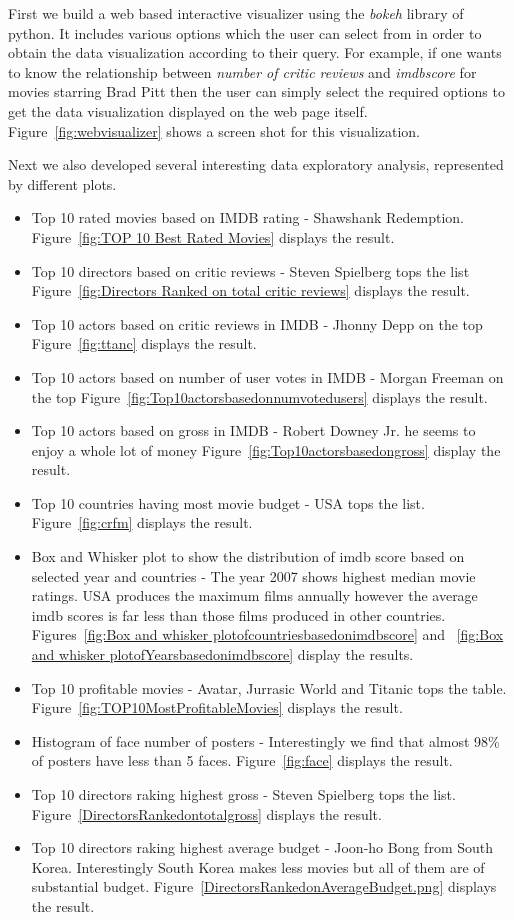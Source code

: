 \documentclass{article}%
\begin{document}
First we build a web based interactive visualizer using the \textit{bokeh} library of python. It includes various options which the user can select from in order to obtain the data visualization according to their query. For example, if one wants to know the relationship between \textit{number of critic reviews} and \textit{imdbscore} for movies starring Brad Pitt then the  user can simply select the required options to get the data visualization displayed on the web page itself. Figure~\ref{fig:webvisualizer} shows a screen shot for this visualization. 

Next we also developed several interesting data exploratory analysis, represented by different plots. 

\begin{itemize}
\item Top 10 rated movies based on IMDB rating - Shawshank Redemption. Figure~\ref{fig:TOP 10 Best Rated Movies} displays the result.
\item Top 10 directors based on critic reviews - Steven Spielberg tops the list Figure~\ref{fig:Directors Ranked on total critic reviews} displays the result.
\item Top 10 actors based on critic reviews in IMDB - Jhonny Depp on the top Figure~\ref{fig:ttanc} displays the result.
\item Top 10 actors based on number of user votes in IMDB - Morgan Freeman on the top Figure~\ref{fig:Top10actorsbasedonnumvotedusers} displays the result.
\item Top 10 actors based on gross in IMDB - Robert Downey Jr. he seems to enjoy a whole lot of money Figure~\ref{fig:Top10actorsbasedongross} display the result.
\item Top 10 countries having most movie budget - USA tops the list. Figure~\ref{fig:crfm} displays the result.
\item Box and Whisker plot to show the distribution of imdb score based on selected year and countries - The year 2007 shows highest median movie ratings. USA produces the maximum films annually however the average imdb scores is far less than those films produced in other countries. Figures~\ref{fig:Box and whisker plotofcountriesbasedonimdbscore} and ~\ref{fig:Box and whisker plotofYearsbasedonimdbscore} display the results.
\item Top 10 profitable movies - Avatar, Jurrasic World and Titanic tops the table. Figure~\ref{fig:TOP10MostProfitableMovies} displays the result.
\item Histogram of face number of posters - Interestingly we find that almost 98\% of posters have less than 5 faces. Figure~\ref{fig:face} displays the result.
\item Top 10 directors raking highest gross - Steven Spielberg tops the list. Figure~\ref{DirectorsRankedontotalgross} displays the result.
\item Top 10 directors raking highest average budget - Joon-ho Bong from South Korea. Interestingly South Korea makes less movies but all of them are of substantial budget. Figure~\ref{DirectorsRankedonAverageBudget.png} displays the result.
\end{itemize}
\end{document}
